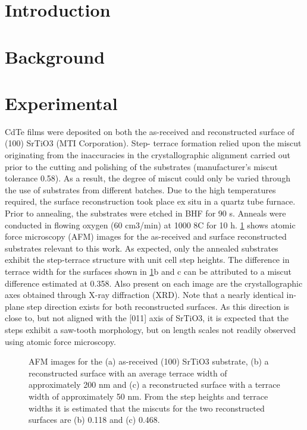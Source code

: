 \section{Introduction}
\section{Background}

\section{Experimental}
CdTe films were deposited on both the as-received and
reconstructed surface of (100) SrTiO3 (MTI Corporation). Step-
terrace formation relied upon the miscut originating from the
inaccuracies in the crystallographic alignment carried out prior to
the cutting and polishing of the substrates (manufacturer’s miscut
tolerance 0.58). As a result, the degree of miscut could only be
varied through the use of substrates from different batches. Due to
the high temperatures required, the surface reconstruction took
place ex situ in a quartz tube furnace. Prior to annealing, the
substrates were etched in BHF for 90 s. Anneals were conducted in
flowing oxygen (60 cm3/min) at 1000 8C for 10 h. \cref{fig:srtio3_sub_afm} shows
atomic force microscopy (AFM) images for the as-received and
surface reconstructed substrates relevant to this work. As
expected, only the annealed substrates exhibit the step-terrace
structure with unit cell step heights. The difference in terrace
width for the surfaces shown in \cref{fig:srtio3_sub_afm}b and c can be attributed to a
miscut difference estimated at 0.358. Also present on each image
are the crystallographic axes obtained through X-ray diffraction
(XRD). Note that a nearly identical in-plane step direction exists for
both reconstructed surfaces. As this direction is close to, but not
aligned with the [011] axis of SrTiO3, it is expected that the steps
exhibit a saw-tooth morphology, but on length scales not readily
observed using atomic force microscopy.
\begin{figure}
    \centering
    \caption{\label{fig:srtio3_sub_afm}AFM images for the (a) as-received (100) SrTiO3 substrate, (b) a reconstructed surface with an average terrace width of approximately 200 nm and (c) a reconstructed
        surface with a terrace width of approximately 50 nm. From the step heights and terrace widths it is estimated that the miscuts for the two reconstructed surfaces are (b) 0.118\degree
        and (c) 0.468\degree.}
\end{figure}

